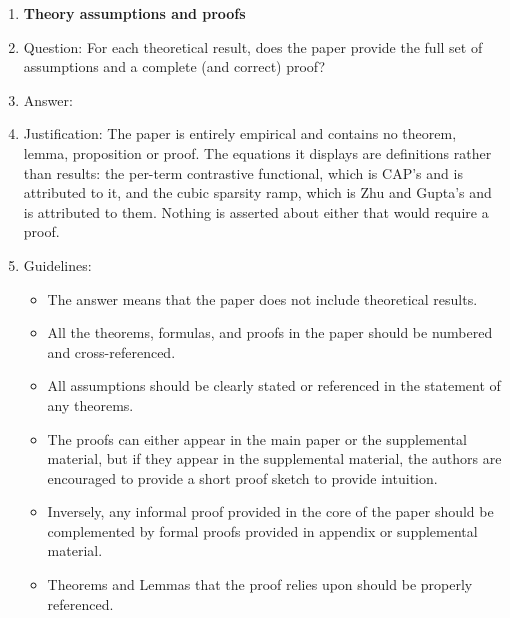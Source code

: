 \begin{enumerate}
\begin{itemize}
        \item The authors should discuss the computational efficiency of the proposed algorithms and how they scale with dataset size.
        \item If applicable, the authors should discuss possible limitations of their approach to address problems of privacy and fairness.
        \item While the authors might fear that complete honesty about limitations might be used by reviewers as grounds for rejection, a worse outcome might be that reviewers discover limitations that aren't acknowledged in the paper. The authors should use their best judgment and recognize that individual actions in favor of transparency play an important role in developing norms that preserve the integrity of the community. Reviewers will be specifically instructed to not penalize honesty concerning limitations.
    \end{itemize}

\item {\bf Theory assumptions and proofs}
    \item[] Question: For each theoretical result, does the paper provide the full set of assumptions and a complete (and correct) proof?
    \item[] Answer: \answerNA{}
    \item[] Justification: The paper is entirely empirical and contains no theorem, lemma, proposition or proof. The equations it displays are definitions rather than results: the per-term contrastive functional, which is CAP's and is attributed to it, and the cubic sparsity ramp, which is Zhu and Gupta's and is attributed to them. Nothing is asserted about either that would require a proof.
    \item[] Guidelines:
    \begin{itemize}
        \item The answer \answerNA{} means that the paper does not include theoretical results.
        \item All the theorems, formulas, and proofs in the paper should be numbered and cross-referenced.
        \item All assumptions should be clearly stated or referenced in the statement of any theorems.
        \item The proofs can either appear in the main paper or the supplemental material, but if they appear in the supplemental material, the authors are encouraged to provide a short proof sketch to provide intuition.
        \item Inversely, any informal proof provided in the core of the paper should be complemented by formal proofs provided in appendix or supplemental material.
        \item Theorems and Lemmas that the proof relies upon should be properly referenced.
    \end{itemize}


\end{enumerate}
